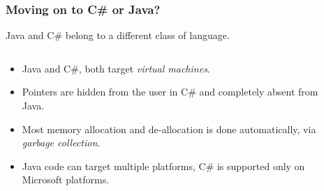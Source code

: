 \documentclass[table]{beamer}
\begin{document}
\begin{frame}
\frametitle{Moving on to C\# or Java?}
Java and C\# belong to a different class of language.
\begin{columns}
\begin{column}{0.55\textwidth}
\begin{itemize}
\item Java and C\#, both target \emph{virtual machines}.
\item Pointers are hidden from the user in C\# and completely absent from Java.
\item Most memory allocation and de-allocation is done automatically, via
\emph{garbage collection}.
\item Java code can target multiple platforms,
C\# is supported only on Microsoft platforms.
\end{itemize}
\end{column}
\begin{column}{0.7\textwidth}
\hspace{-0.57in}
\end{column}
\end{columns}
\end{frame}
\end{document}
